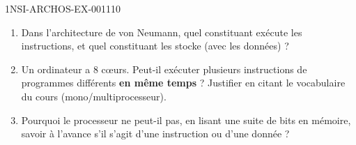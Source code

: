 \begin{exercice}{1NSI-ARCHOS-EX-001}{1}{10}
\begin{enumerate}
  \item Dans l'architecture de von Neumann, quel constituant exécute les instructions, et quel constituant les stocke (avec les données) ?
  \item Un ordinateur a $8$ cœurs. Peut-il exécuter plusieurs instructions de programmes différents \textbf{en même temps} ? Justifier en citant le vocabulaire du cours (mono/multiprocesseur).
  \item Pourquoi le processeur ne peut-il pas, en lisant une suite de bits en mémoire, savoir \og à l'avance \fg{} s'il s'agit d'une instruction ou d'une donnée ?
\end{enumerate}
\end{exercice}
